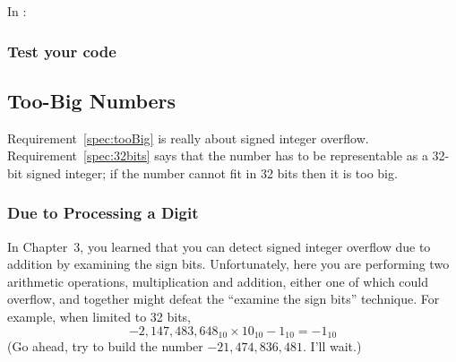 In :
\begin{description}
\end{description}

\subsubsection*{Test your code}
\begin{description}
        \begin{description}
        \end{description}
\end{description}



\subsection{Too-Big Numbers}

Requirement~\ref{spec:tooBig} is really about signed integer overflow.
Requirement~\ref{spec:32bits} says that the number has to be representable as a 32-bit signed integer;
if the number cannot fit in 32 bits then it is too big.

\subsubsection{Due to Processing a Digit}

In Chapter~3, you learned that you can detect signed integer overflow due to addition by examining the sign bits.
Unfortunately, here you are performing two arithmetic operations, multiplication and addition, either one of which could overflow, and together might defeat the ``examine the sign bits'' technique.
For example, when limited to 32 bits, \[-2,147,483,648_{10} \times 10_{10} - 1_{10} = -1_{10}\]
(Go ahead, try to build the number $-21,474,836,481$. I'll wait.)

